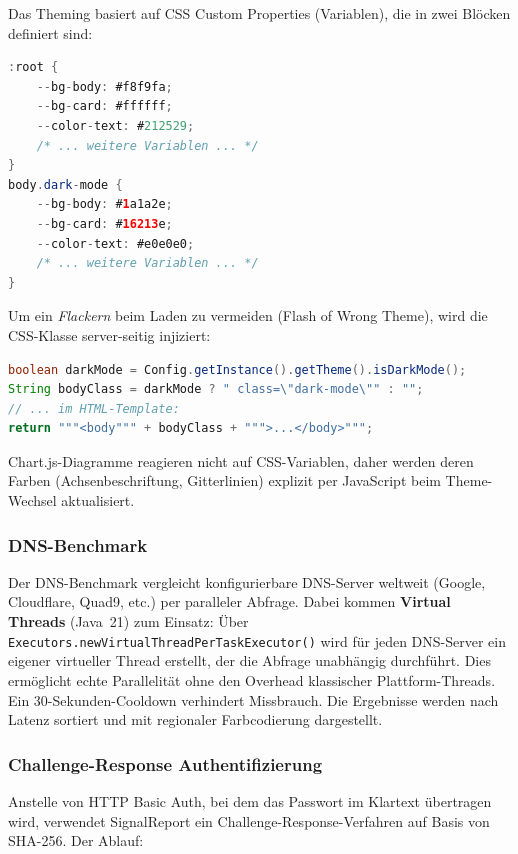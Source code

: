 Das Theming basiert auf CSS Custom Properties (Variablen), die in zwei Blöcken
definiert sind:

\begin{lstlisting}[language=Java, caption={CSS-Variablen für Light/Dark Mode}]
:root {
    --bg-body: #f8f9fa;
    --bg-card: #ffffff;
    --color-text: #212529;
    /* ... weitere Variablen ... */
}
body.dark-mode {
    --bg-body: #1a1a2e;
    --bg-card: #16213e;
    --color-text: #e0e0e0;
    /* ... weitere Variablen ... */
}
\end{lstlisting}

Um ein \textit{Flackern} beim Laden zu vermeiden (Flash of Wrong Theme), wird die
CSS-Klasse server-seitig injiziert:

\begin{lstlisting}[language=Java, caption={Server-seitige Theme-Injection}]
boolean darkMode = Config.getInstance().getTheme().isDarkMode();
String bodyClass = darkMode ? " class=\"dark-mode\"" : "";
// ... im HTML-Template:
return """<body""" + bodyClass + """>...</body>""";
\end{lstlisting}

Chart.js-Diagramme reagieren nicht auf CSS-Variablen, daher werden deren Farben
(Achsenbeschriftung, Gitterlinien) explizit per JavaScript beim Theme-Wechsel
aktualisiert.

\subsubsection{DNS-Benchmark}

Der DNS-Benchmark vergleicht konfigurierbare DNS-Server weltweit (Google, Cloudflare,
Quad9, etc.) per paralleler Abfrage. Dabei kommen \textbf{Virtual Threads}
(Java~21) zum Einsatz: Über \texttt{Executors.newVirtualThreadPerTaskExecutor()}
wird für jeden DNS-Server ein eigener virtueller Thread erstellt, der die Abfrage
unabhängig durchführt. Dies ermöglicht echte Parallelität ohne den Overhead
klassischer Plattform-Threads. Ein 30-Sekunden-Cooldown verhindert Missbrauch.
Die Ergebnisse werden nach Latenz sortiert und mit regionaler Farbcodierung dargestellt.

\subsubsection{Challenge-Response Authentifizierung}

Anstelle von HTTP Basic Auth, bei dem das Passwort im Klartext übertragen wird,
verwendet SignalReport ein Challenge-Response-Verfahren auf Basis von SHA-256.
Der Ablauf:

